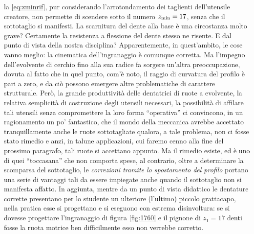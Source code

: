 la \ref{eq:zminrif}, pur considerando l'arrotondamento dei taglienti
dell'utensile creatore, non permette di scendere sotto il numero 
$z_{\rm min}=17$, senza che il sottotaglio si manifesti. La scarnitura del
dente alla base \`e una circostanza molto grave? Certamente la resistenza
a flessione del dente stesso ne risente. E dal punto di vista della nostra
disciplina? Apparentemente, in quest'ambito, le cose vanno meglio: la cinematica
dell'ingranaggio \`e comunque corretta. Ma l'impegno dell'evolvente di cerchio
fino alla sua radice fa sorgere un'altra preoccupazione, dovuta al fatto che
in quel punto, com'\`e noto, il raggio di curvatura del profilo \`e pari a zero,
e da ci\`o possono emergere altre problematiche di carattere strutturale.
Per\`o, la grande produttivit\`a delle dentatrici di ruote a evolvente,
la relativa semplicit\`a di costruzione degli utensili necessari,
la possibilit\`a di affilare tali utensili senza compromettere la loro
forma ``operativa'' ci convincono, in un ragionamento un po' fantastico,
che il mondo della meccanica avrebbe accettato tranquillamente anche le
ruote sottotagliate qualora, a tale problema, non ci fosse stato rimedio
 e anzi, in talune applicazioni, cui faremo cenno alla
fine del prossimo paragrafo, tali ruote si accettano appunto.
Ma il rimedio esiste, ed \`e uno di quei ``toccasana'' che non comporta
spese, al contrario, oltre a determinare la scomparsa del sottotaglio,
le {\em correzioni tramite
lo spostamento del profilo} portano una serie
di vantaggi tali da essere impiegate anche quando il sottotaglio non si
manifesta affatto.
In aggiunta, mentre da un punto di vista didattico le dentature
corrette presentano per lo studente un ulteriore (l'ultimo) piccolo
grattacapo, nella pratica esse si progettano e si eseguono con estrema
disinvoltura: se si dovesse progettare l'ingranaggio di figura \ref{fig:1760}
e il pignone di $z_1=17$ denti fosse la ruota motrice
ben difficilmente esso non verrebbe corretto.

